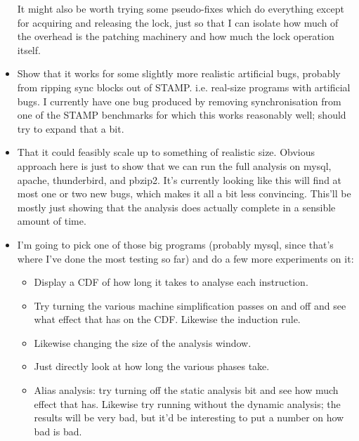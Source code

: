 \begin{itemize}
  It might also be worth trying some pseudo-fixes which do everything
  except for acquiring and releasing the lock, just so that I can
  isolate how much of the overhead is the patching machinery and how
  much the lock operation itself.

\item Show that it works for some slightly more realistic artificial
  bugs, probably from ripping sync blocks out of STAMP.
  i.e. real-size programs with artificial bugs.  I currently have one
  bug produced by removing synchronisation from one of the STAMP
  benchmarks for which this works reasonably well; should try to
  expand that a bit.

\item That it could feasibly scale up to something of realistic size.
  Obvious approach here is just to show that we can run the full
  analysis on mysql, apache, thunderbird, and pbzip2.  It's currently
  looking like this will find at most one or two new bugs, which makes
  it all a bit less convincing.  This'll be mostly just showing that
  the analysis does actually complete in a sensible amount of time.

\item I'm going to pick one of those big programs (probably mysql,
  since that's where I've done the most testing so far) and do a few
  more experiments on it:

  \begin{itemize}
  \item Display a CDF of how long it takes to analyse each
    instruction.
  \item Try turning the various machine simplification passes on and
    off and see what effect that has on the CDF.  Likewise the
    induction rule.
  \item Likewise changing the size of the analysis window.
  \item Just directly look at how long the various phases
    take.
  \item Alias analysis: try turning off the static analysis bit and
    see how much effect that has.  Likewise try running without the
    dynamic analysis; the results will be very bad, but it'd be
    interesting to put a number on how bad is bad.
  \end{itemize}


\end{itemize}
